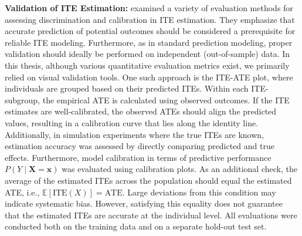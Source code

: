 \textbf{Validation of ITE Estimation:} \label{sec:ite_validation} \citet{hoogland2024} examined a variety of evaluation methods for assessing discrimination and calibration in ITE estimation. They emphasize that accurate prediction of potential outcomes should be considered a prerequisite for reliable ITE modeling. Furthermore, as in standard prediction modeling, proper validation should ideally be performed on independent (out-of-sample) data.
In this thesis, although various quantitative evaluation metrics exist, we primarily relied on visual validation tools. One such approach is the ITE-ATE plot, where individuals are grouped based on their predicted ITEs. Within each ITE-subgroup, the empirical ATE is calculated using observed outcomes. If the ITE estimates are well-calibrated, the observed ATEs should align the predicted values, resulting in a calibration curve that lies along the identity line. Additionally, in simulation experiments where the true ITEs are known, estimation accuracy was assessed by directly comparing predicted and true effects. Furthermore, model calibration in terms of predictive performance $P(Y \mid \mathbf{X} = \mathbf{x})$ was evaluated using calibration plots. As an additional check, the average of the estimated ITEs across the population should equal the estimated ATE, i.e., $\mathbb{E}[\text{ITE}(X)] = \text{ATE}$. Large deviations from this condition may indicate systematic bias. However, satisfying this equality does not guarantee that the estimated ITEs are accurate at the individual level. All evaluations were conducted both on the training data and on a separate hold-out test set.

% 
% 
% 



